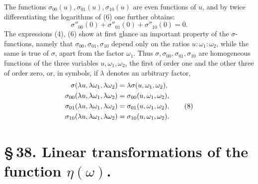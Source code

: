 \documentclass[11pt]{article}
\begin{document}
The functions $\sigma_{00}(u),\sigma_{01}(u),\sigma_{10}(u)$ are even functions of $u$, and by twice differentiating the logarithms of (6) one further obtains:
\begin{equation}
\sigma''_{00}(0)+\sigma''_{01}(0)+\sigma''_{10}(0)=0. \tag{7}
\end{equation}
The expressions (4), (6) show at first glance an important property of the $\sigma$-functions, namely that $\sigma_{00},\sigma_{01},\sigma_{10}$ depend only on the ratios $u:\omega_1:\omega_2$, while the same is true of $\sigma$, apart from the factor $\omega_1$. Thus $\sigma,\sigma_{00},\sigma_{01},\sigma_{10}$ are homogeneous functions of the three variables $u,
\omega_1,
\omega_2$, the first of order one and the other three of order zero, or, in symbols, if $\lambda$ denotes an arbitrary factor,
\begin{align}
\sigma(\lambda u,\lambda\omega_1,\lambda\omega_2)&=\lambda\sigma(u,\omega_1,
\omega_2),\notag\\
\sigma_{00}(\lambda u,\lambda\omega_1,\lambda\omega_2)&=\sigma_{00}(u,
\omega_1,
\omega_2),\notag\\
\sigma_{01}(\lambda u,\lambda\omega_1,\lambda\omega_2)&=\sigma_{01}(u,
\omega_1,
\omega_2), \tag{8}\\
\sigma_{10}(\lambda u,\lambda\omega_1,\lambda\omega_2)&=\sigma_{10}(u,
\omega_1,
\omega_2).\notag
\end{align}

\section*{\S\,38. Linear transformations of the function $\eta(\omega)$.}
\end{document}
